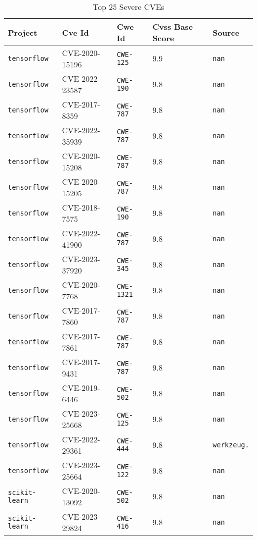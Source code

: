\begin{table}
\caption{Top 25 Severe CVEs}
\label{tab:most-severe-cwe}
\begin{tabular}{lllll}
\toprule
Project & Cve Id & Cwe Id & Cvss Base Score & Source \\
\midrule
\texttt{tensorflow} & CVE-2020-15196 & \texttt{CWE-125} & $9.9$ & \texttt{nan} \\
\texttt{tensorflow} & CVE-2022-23587 & \texttt{CWE-190} & $9.8$ & \texttt{nan} \\
\texttt{tensorflow} & CVE-2017-8359 & \texttt{CWE-787} & $9.8$ & \texttt{nan} \\
\texttt{tensorflow} & CVE-2022-35939 & \texttt{CWE-787} & $9.8$ & \texttt{nan} \\
\texttt{tensorflow} & CVE-2020-15208 & \texttt{CWE-787} & $9.8$ & \texttt{nan} \\
\texttt{tensorflow} & CVE-2020-15205 & \texttt{CWE-787} & $9.8$ & \texttt{nan} \\
\texttt{tensorflow} & CVE-2018-7575 & \texttt{CWE-190} & $9.8$ & \texttt{nan} \\
\texttt{tensorflow} & CVE-2022-41900 & \texttt{CWE-787} & $9.8$ & \texttt{nan} \\
\texttt{tensorflow} & CVE-2023-37920 & \texttt{CWE-345} & $9.8$ & \texttt{nan} \\
\texttt{tensorflow} & CVE-2020-7768 & \texttt{CWE-1321} & $9.8$ & \texttt{nan} \\
\texttt{tensorflow} & CVE-2017-7860 & \texttt{CWE-787} & $9.8$ & \texttt{nan} \\
\texttt{tensorflow} & CVE-2017-7861 & \texttt{CWE-787} & $9.8$ & \texttt{nan} \\
\texttt{tensorflow} & CVE-2017-9431 & \texttt{CWE-787} & $9.8$ & \texttt{nan} \\
\texttt{tensorflow} & CVE-2019-6446 & \texttt{CWE-502} & $9.8$ & \texttt{nan} \\
\texttt{tensorflow} & CVE-2023-25668 & \texttt{CWE-125} & $9.8$ & \texttt{nan} \\
\texttt{tensorflow} & CVE-2022-29361 & \texttt{CWE-444} & $9.8$ & \texttt{werkzeug.} \\
\texttt{tensorflow} & CVE-2023-25664 & \texttt{CWE-122} & $9.8$ & \texttt{nan} \\
\texttt{scikit-learn} & CVE-2020-13092 & \texttt{CWE-502} & $9.8$ & \texttt{nan} \\
\texttt{scikit-learn} & CVE-2023-29824 & \texttt{CWE-416} & $9.8$ & \texttt{nan} \\

\end{tabular}
\end{table}
